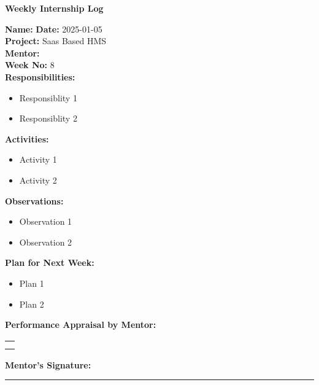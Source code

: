 \begin{center}
  \bfseries Weekly Internship Log
\end{center}

\noindent
\textbf{Name:}  \hfill \textbf{Date:} 2025-01-05 \\
\textbf{Project:} Saas Based HMS \hfill \\
\textbf{Mentor:}   \\
\textbf{Week No:} 8 \\

\noindent
\textbf{Responsibilities:}
\begin{itemize}
    \item Responsiblity 1
    \item Responsiblity 2
\end{itemize}

\noindent
\textbf{Activities:}
\begin{itemize}
    \item Activity 1
    \item Activity 2
\end{itemize}

\noindent
\textbf{Observations:}
\begin{itemize}
    \item Observation 1
    \item Observation 2
\end{itemize}

\noindent
\textbf{Plan for Next Week:}
\begin{itemize}
    \item  Plan 1
    \item Plan 2
\end{itemize}

\noindent
\textbf{Performance Appraisal by Mentor:} \\
\begin{table}[h]
    \centering
    \noindent
    \begin{tabularx}{\textwidth} { 
        | >{\centering\arraybackslash}X| }

        \hline
          \\ \\       	                    
        \hline
    \end{tabularx}
\end{table}


\vspace{2em}
\noindent
\textbf{Mentor’s Signature:} \\
\rule{0.4\textwidth}{0.5pt}
